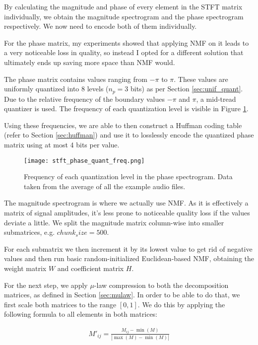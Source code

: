 By calculating the magnitude and phase of every element in the STFT matrix individually, we obtain the magnitude spectrogram and the phase spectrogram respectively. We now need to encode both of them individually.

For the phase matrix, my experiments showed that applying NMF on it leads to a very noticeable loss in quality, so instead I opted for a different solution that ultimately ends up saving more space than NMF would.

The phase matrix contains values ranging from $-\pi$ to $\pi$. These values are uniformly quantized into 8 levels ($n_p = 3$ bits) as per Section \ref{sec:unif_quant}. Due to the relative frequency of the boundary values $-\pi$ and $\pi$, a mid-tread quantizer is used. The frequency of each quantization level is visible in Figure \ref{fig:stft_phase_quant_freq}.

Using these frequencies, we are able to then construct a Huffman coding table (refer to Section \ref{sec:huffman}) and use it to losslessly encode the quantized phase matrix using at most 4 bits per value.

\begin{figure}[ht]
	\caption[ANMF-STFT quantized phase frequencies]{Frequency of each quantization level in the phase spectrogram. Data taken from the average of all the example audio files.}
	\label{fig:stft_phase_quant_freq}
	\centering
	\texttt{[image: stft\_phase\_quant\_freq.png]}
\end{figure}

The magnitude spectrogram is where we actually use NMF. As it is effectively a matrix of signal amplitudes, it's less prone to noticeable quality loss if the values deviate a little. We split the magnitude matrix column-wise into smaller submatrices, e.g. $chunk_size = 500$.

For each submatrix we then increment it by its lowest value to get rid of negative values and then run basic random-initialized Euclidean-based NMF, obtaining the weight matrix $W$ and coefficient matrix $H$.

For the next step, we apply $\mu$-law compression to both the decomposition matrices, as defined in Section \ref{sec:mulaw}. In order to be able to do that, we first scale both matrices to the range $[0, 1]$. We do this by applying the following formula to all elements in both matrices:

\begin{align}
\label{equ:scale_01}
M'_{ij} = \frac{M_{ij} - \min(M)}{|\max(M) - \min(M)|}
\end{align}


